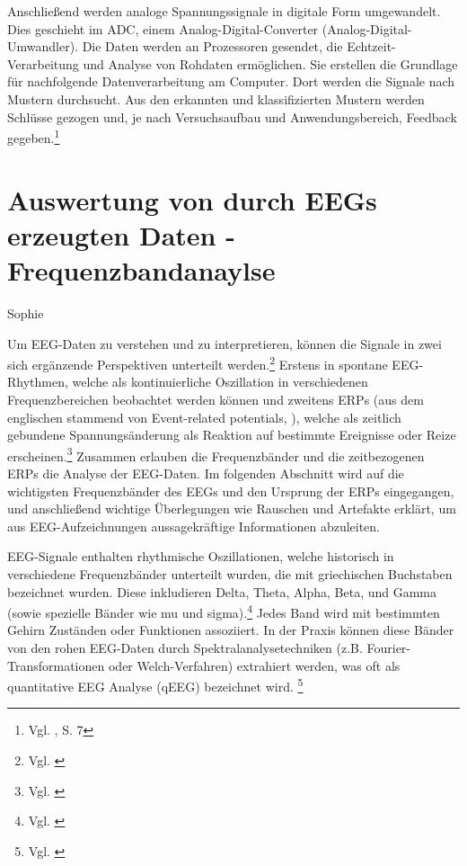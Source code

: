 Anschließend werden analoge Spannungssignale in digitale Form umgewandelt. Dies geschieht im ADC, einem Analog-Digital-Converter (Analog-Digital-Umwandler). Die Daten werden an Prozessoren gesendet, die Echtzeit-Verarbeitung und Analyse von Rohdaten ermöglichen. Sie erstellen die Grundlage für nachfolgende Datenverarbeitung am Computer.
Dort werden die Signale nach Mustern durchsucht. Aus den erkannten und klassifizierten Mustern werden Schlüsse gezogen und, je nach Versuchsaufbau und Anwendungsbereich, Feedback gegeben.\footnote{Vgl. \cite{qin2023}, S. 7}





\section{Auswertung von durch EEGs erzeugten Daten - Frequenzbandanaylse}
Sophie \newline

Um EEG-Daten zu verstehen und zu interpretieren, können die Signale in zwei sich ergänzende Perspektiven unterteilt werden.\footnote{Vgl. \cite{wikipedia_eeg_nyquist}} 
 Erstens in spontane EEG-Rhythmen, welche als kontinuierliche Oszillation in verschiedenen Frequenzbereichen beobachtet werden können und zweitens ERPs (aus dem englischen stammend von Event-related potentials, ), welche als zeitlich gebundene Spannungsänderung als Reaktion auf bestimmte Ereignisse oder Reize erscheinen.\footnote{Vgl. \cite{wikipedia_eeg_nyquist}} Zusammen erlauben die Frequenzbänder und die zeitbezogenen ERPs die Analyse der EEG-Daten. 
Im folgenden Abschnitt wird auf die wichtigsten Frequenzbänder des EEGs und den Ursprung der ERPs eingegangen, und anschließend wichtige Überlegungen wie Rauschen und Artefakte erklärt, um aus EEG-Aufzeichnungen aussagekräftige Informationen abzuleiten. 

EEG-Signale enthalten rhythmische Oszillationen, welche historisch in verschiedene Frequenzbänder unterteilt wurden, die mit griechischen Buchstaben bezeichnet wurden. Diese inkludieren Delta, Theta, Alpha, Beta, und Gamma (sowie spezielle Bänder wie mu und sigma).\footnote{Vgl. \cite{nayak_waveforms}}  Jedes Band wird mit bestimmten Gehirn Zuständen oder Funktionen assoziiert. In der Praxis können diese Bänder von den rohen EEG-Daten durch Spektralanalysetechniken (z.B. Fourier-Transformationen oder Welch-Verfahren) extrahiert werden, was oft als quantitative EEG Analyse (qEEG) bezeichnet wird. \footnote{Vgl. \cite{wikipedia_eeg_nyquist}} 

